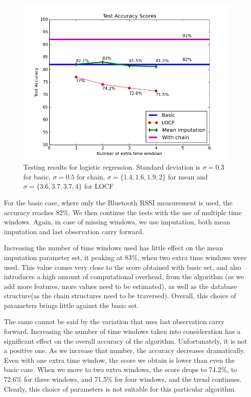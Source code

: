 \begin{figure}[h]
	\begin{center}
		\includegraphics[scale=0.7]{figures/logic_tot.png}
	\end{center}
	
	\caption{Testing results for logistic regression. Standard deviation is $\sigma= 0.3 $ for basic, $\sigma= 0.5 $ for chain, $\sigma=\lbrace 1.4, 1.6, 1.9, 2 \rbrace $ for mean and  $\sigma=\lbrace 3.6, 3.7, 3.7, 4 \rbrace$ for LOCF}
	\label{pic:logic_tot}

\end{figure}

For the basic case, where only the Bluetooth RSSI measurement is used, the accuracy reaches 82\%. We then continue the tests with the use of multiple time windows. Again, in case of missing windows, we use imputation, both mean imputation and last observation carry forward. 

Increasing the number of time windows used has little effect on the mean imputation parameter set, it peaking at 83\%, when two extra time windows were used. This value comes very close to the score obtained with basic set, and also introduces a high amount of computational overhead, from the algorithm (as we add more features, more values need to be estimated), as well as the database structure(as the chain structures need to be traversed). Overall, this choice of parameters brings little against the basic set.

The same cannot be said by the variation that uses last observation carry forward. Increasing the number of time windows taken into consideration has a significant effect on the overall accuracy of the algorithm. Unfortunately, it is not a positive one. As we increase that number, the accuracy decreases dramatically. Even with one extra time window, the score we obtain is lower than even the basic case. When we move to two extra windows, the score drops to 74.2\%, to 72.6\% for three windows, and 71.5\% for four windows, and the trend continues. Clearly, this choice of parameters is not suitable for this particular algorithm. 

